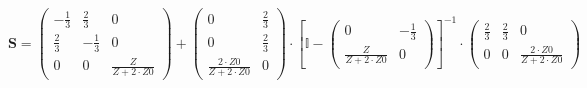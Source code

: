 \[ \mathbf{S} = \left(\begin{array}{ccc} -\frac{1}{3} & \frac{2}{3} &
0 \\ \frac{2}{3} & -\frac{1}{3} & 0 \\ 0 & 0 & \frac{Z}{Z+2\cdot Z0}
\end{array}\right) + \left(\begin{array}{cc} 0 & \frac{2}{3} \\ 0 &
\frac{2}{3} \\ \frac{2\cdot Z0}{Z+2\cdot Z0} & 0 \end{array}\right)
\cdot \left[ \mathbb{I}  - \left(\begin{array}{cc} 0 & -\frac{1}{3} \\
\frac{Z}{Z+2\cdot Z0} & 0 \end{array}\right) \right]^{-1}
\cdot\left(\begin{array}{ccc} \frac{2}{3} & \frac{2}{3} & 0 \\ 0 & 0 &
\frac{2\cdot Z0}{Z+2\cdot Z0} \end{array}\right) \]
